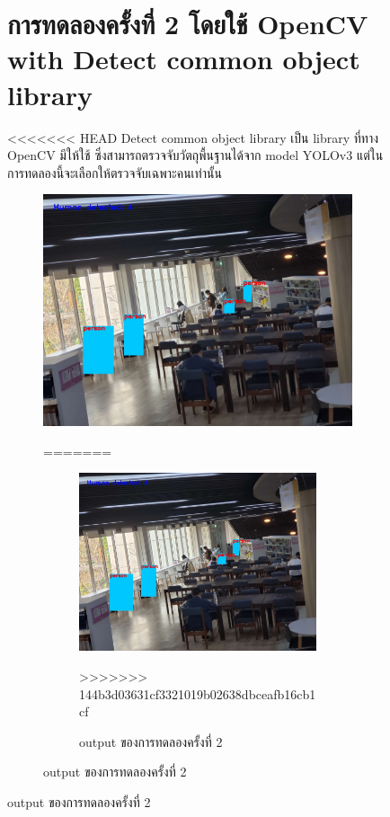 \begin{figure}[h]
\section{การทดลองครั้งที่ 2 โดยใช้ OpenCV with Detect common object library}
<<<<<<< HEAD
\hspace{10mm}Detect common object library เป็น library ที่ทาง OpenCV มีให้ใช้ ซึ่งสามารถตรวจจับวัตถุพื้นฐานได้จาก model YOLOv3 แต่ในการทดลองนี้จะเลือกให้ตรวจจับเฉพาะคนเท่านั้น
\begin{figure}[h]
    \centering
    \includegraphics[scale=0.25]{images/cvlib_output.jpg}
    \caption[output]{output ของการทดลองครั้งที่ 2}
    \label{fig:output2}
=======
\begin{figure}[ht]
\centering
\includegraphics[scale=0.25]{images/cvlib_output.jpg}
\caption[output2]{output ของการทดลองครั้งที่ 2}
\label{fig:output2}
>>>>>>> 144b3d03631cf3321019b02638dbceafb16cb1cf
\end{figure}


\end{figure}
\end{figure}
